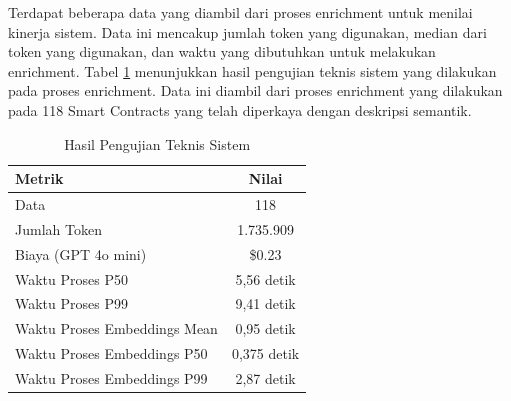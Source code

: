 Terdapat beberapa data yang diambil dari proses enrichment untuk menilai kinerja sistem. Data ini mencakup jumlah token yang digunakan, median dari token yang digunakan, dan waktu yang dibutuhkan untuk melakukan enrichment. Tabel \ref{table:hasil-pengujian-teknis-sistem} menunjukkan hasil pengujian teknis sistem yang dilakukan pada proses enrichment. Data ini diambil dari proses enrichment yang dilakukan pada 118 Smart Contracts yang telah diperkaya dengan deskripsi semantik.

\begin{table}[ht]
	\centering
	\caption{Hasil Pengujian Teknis Sistem}
	\label{table:hasil-pengujian-teknis-sistem}
	\begin{tabular}{|l|c|}
		\hline
		\textbf{Metrik}              & \textbf{Nilai} \\ \hline
		Data                         & 118            \\ \hline
		Jumlah Token                 & 1.735.909      \\ \hline
		Biaya (GPT 4o mini)          & \$0.23         \\ \hline
		Waktu Proses P50             & 5,56 detik     \\ \hline
		Waktu Proses P99             & 9,41 detik     \\ \hline
		Waktu Proses Embeddings Mean & 0,95 detik     \\ \hline
		Waktu Proses Embeddings P50  & 0,375 detik    \\ \hline
		Waktu Proses Embeddings P99  & 2,87 detik     \\ \hline
	\end{tabular}
\end{table}
